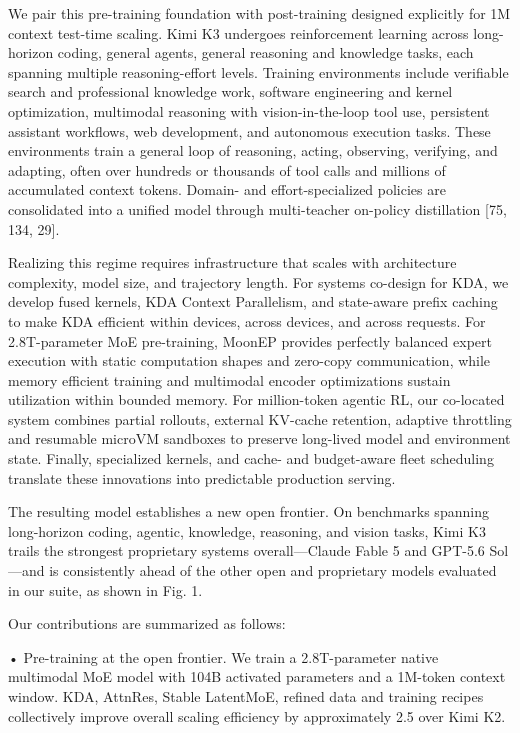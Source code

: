 \documentclass[
  10
]{article}
\begin{document}
We pair this pre-training foundation with post-training designed
explicitly for 1M context test-time scaling. Kimi K3 undergoes
reinforcement learning across long-horizon coding, general agents,
general reasoning and knowledge tasks, each spanning multiple
reasoning-effort levels. Training environments include verifiable search
and professional knowledge work, software engineering and kernel
optimization, multimodal reasoning with vision-in-the-loop tool use,
persistent assistant workflows, web development, and autonomous
execution tasks. These environments train a general loop of reasoning,
acting, observing, verifying, and adapting, often over hundreds or
thousands of tool calls and millions of accumulated context tokens.
Domain- and effort-specialized policies are consolidated into a unified
model through multi-teacher on-policy distillation {[}75, 134, 29{]}.

Realizing this regime requires infrastructure that scales with
architecture complexity, model size, and trajectory length. For systems
co-design for KDA, we develop fused kernels, KDA Context Parallelism,
and state-aware prefix caching to make KDA efficient within devices,
across devices, and across requests. For 2.8T-parameter MoE
pre-training, MoonEP provides perfectly balanced expert execution with
static computation shapes and zero-copy communication, while memory
efficient training and multimodal encoder optimizations sustain
utilization within bounded memory. For million-token agentic RL, our
co-located system combines partial rollouts, external KV-cache
retention, adaptive throttling and resumable microVM sandboxes to
preserve long-lived model and environment state. Finally, specialized
kernels, and cache- and budget-aware fleet scheduling translate these
innovations into predictable production serving.

The resulting model establishes a new open frontier. On benchmarks
spanning long-horizon coding, agentic, knowledge, reasoning, and vision
tasks, Kimi K3 trails the strongest proprietary systems overall---Claude
Fable 5 and GPT-5.6 Sol---and is consistently ahead of the other open
and proprietary models evaluated in our suite, as shown in Fig. 1.

Our contributions are summarized as follows:

• Pre-training at the open frontier. We train a 2.8T-parameter native
multimodal MoE model with 104B activated parameters and a 1M-token
context window. KDA, AttnRes, Stable LatentMoE, refined data and
training recipes collectively improve overall scaling efficiency by
approximately 2.5 over Kimi K2.
\end{document}
